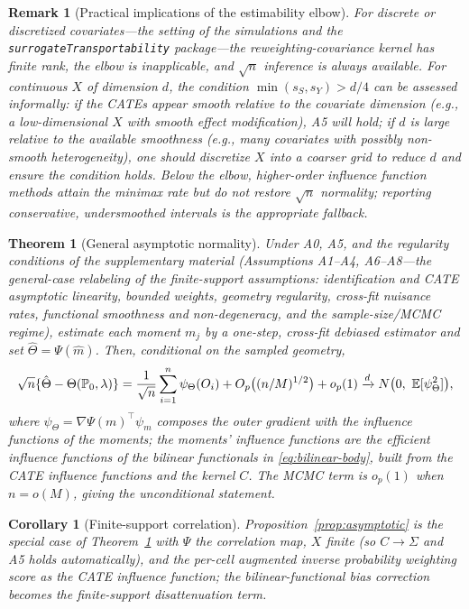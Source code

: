 \documentclass{article}
\newtheorem{theorem}{Theorem}
\newtheorem{corollary}{Corollary}
\newtheorem{remark}{Remark}
\newcommand{\PP}{\mathbb{P}}
\begin{document}
\begin{remark}[Practical implications of the estimability elbow]\label{rem:elbow-practice}
For discrete or discretized covariates---the setting of the simulations and the
\texttt{surrogateTransportability} package---the reweighting-covariance kernel has
finite rank, the elbow is inapplicable, and $\sqrt{n}$ inference is always
available. For continuous $X$ of dimension $d$, the condition $\min(s_S,s_Y)>d/4$
can be assessed informally: if the CATEs appear smooth relative to
the covariate dimension (e.g., a low-dimensional $X$ with smooth effect modification),
A5 will hold; if $d$ is large relative to the available smoothness (e.g., many
covariates with possibly non-smooth heterogeneity), one should discretize $X$ into
a coarser grid to reduce $d$ and ensure the condition holds. Below the elbow,
higher-order influence function methods \citep{Robins2008HOIF,Kennedy2024Minimax}
attain the minimax rate but do not restore $\sqrt{n}$ normality; reporting
conservative, undersmoothed intervals is the appropriate fallback.
\end{remark}

\begin{theorem}[General asymptotic normality]\label{thm:general-body}
Under A0, A5, and the regularity conditions of the supplementary material
(Assumptions A1--A4, A6--A8---the general-case relabeling of the finite-support
assumptions: identification and CATE asymptotic linearity, bounded
weights, geometry regularity, cross-fit nuisance rates, functional smoothness and
non-degeneracy, and the sample-size/MCMC regime), estimate each moment $m_j$ by a
one-step, cross-fit debiased estimator and set $\hat\Theta=\Psi(\hat m)$. Then,
conditional on the sampled geometry,
\begin{equation}
    \sqrt{n}\{\hat\Theta - \Theta(\PP_0,\lambda)\}
    = \frac{1}{\sqrt n}\sum_{i=1}^n \psi_\Theta(O_i) + O_p\big((n/M)^{1/2}\big) + o_p(1)
    \xrightarrow{d} N\big(0,\ \E[\psi_\Theta^2]\big),
\end{equation}
where $\psi_\Theta=\nabla\Psi(m)^\top\psi_m$ composes the outer gradient with the
influence functions of the moments; the moments' influence functions are the
efficient influence functions of the bilinear functionals in
\eqref{eq:bilinear-body}, built from the CATE influence functions and the kernel
$C$. The MCMC term is $o_p(1)$ when $n=o(M)$, giving the unconditional statement.
\end{theorem}

\begin{corollary}[Finite-support correlation]\label{cor:finite-body}
Proposition~\ref{prop:asymptotic} is the special case of Theorem~\ref{thm:general-body}
with $\Psi$ the correlation map, $X$ finite (so $C\to\Sigma$ and A5 holds
automatically), and the per-cell augmented inverse probability weighting score as
the CATE influence function; the bilinear-functional bias correction becomes the
finite-support disattenuation term.
\end{corollary}
\end{document}
